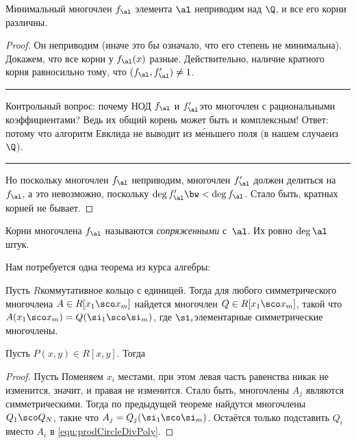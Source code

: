 \documentclass[a4paper]{article}
\newenvironment{petit}
{\par\smallskip\hrule\smallskip\footnotesize}{\par\smallskip\hrule\smallskip}
\begin{document}
\begin{stm}
Минимальный многочлен $f_\al$ элемента $\al$ неприводим над $\Q$, и все его корни различны.
\end{stm}
\begin{proof}
Он неприводим (иначе это бы означало, что его степень не минимальна).
Докажем, что все корни у $f_{\al}(x)$ разные. Действительно, наличие кратного корня
равносильно тому, что $(f_\al, f_\al') \neq 1$.
\begin{petit}
Контрольный вопрос: почему НОД $f_\al$ и $f_\al'$\т это многочлен с рациональными коэффициентами?
Ведь их общий корень может быть и комплексным! Ответ: потому что алгоритм Евклида не выводит из м\'еньшего
поля (в нашем случае\т из $\Q$).
\end{petit}
Но поскольку многочлен $f_\al$ неприводим, многочлен $f_\al'$ должен
делиться на $f_\al$, а это невозможно, поскольку $\deg f'_\al\bw<\deg f_\al$. Стало быть, кратных корней не бывает.
\end{proof}

\begin{df}
Корни многочлена $f_{\al}$ называются \emph{сопряженными} с~$\al$. Их ровно $\deg\al$ штук.
\end{df}

Нам потребуется одна теорема из курса алгебры:

\begin{theorem}\label{thm:symPoly}
Пусть $R$\т  коммутативное кольцо с единицей. Тогда для любого симметрического многочлена $A\in
R[x_1\sco x_m]$ найдется многочлен $Q\in R[x_1\sco x_m]$, такой что $A(x_1\sco x_m)=Q(\si_1\sco \si_m)$, где
$\si_i$\т элементарные симметрические многочлены.
\end{theorem}

\begin{lemma}\label{lem:rationalPoly}
Пусть $P(x,y)\in R[x,y]$. Тогда
\end{lemma}
\begin{proof}
Пусть
Поменяем $x_i$ местами, при этом левая часть равенства никак не изменится, значит, и правая не изменится.
Стало быть, многочлены $A_j$ являются симметрическими.
Тогда по предыдущей теореме найдутся многочлены $Q_1\sco Q_N$, такие что $A_j=Q_j(\si_1\sco \si_m)$.
Остаётся только подставить $Q_i$ вместо $A_i$ в \eqref{eqn:prodCircleDivPoly}.
\end{proof}
\end{document}
